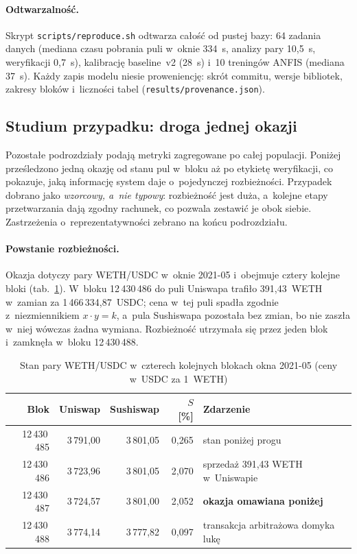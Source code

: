 \paragraph{Odtwarzalność.} Skrypt \texttt{scripts/reproduce.sh} odtwarza całość od pustej bazy:
64 zadania danych (mediana czasu pobrania puli w~oknie 334~s, analizy pary 10,5~s, weryfikacji
0,7~s), kalibrację baseline~v2 (28~s) i~10 treningów ANFIS (mediana 37~s). Każdy zapis modelu
niesie proweniencję: skrót commitu, wersje bibliotek, zakresy bloków i~liczności tabel
(\texttt{results/provenance.json}).

\subsection{Studium przypadku: droga jednej okazji}

Pozostałe podrozdziały podają metryki zagregowane po całej populacji. Poniżej prześledzono jedną okazję od stanu pul w~bloku
aż po etykietę weryfikacji, co pokazuje, jaką informację system daje o~pojedynczej
rozbieżności. Przypadek dobrano jako \emph{wzorcowy, a~nie typowy}:
rozbieżność jest duża, a~kolejne etapy przetwarzania dają zgodny rachunek, co pozwala zestawić
je obok siebie. Zastrzeżenia o~reprezentatywności zebrano na końcu podrozdziału.


\paragraph{Powstanie rozbieżności.} Okazja dotyczy pary WETH/USDC w~oknie 2021-05 i~obejmuje
cztery kolejne bloki (tab.~\ref{tab:case-blocks}). W~bloku 12\,430\,486 do puli Uniswapa trafiło
391,43~WETH w~zamian za 1\,466\,334,87~USDC; cena w~tej puli spadła zgodnie z~niezmiennikiem
$x\cdot y=k$, a~pula Sushiswapa pozostała bez zmian, bo nie zaszła w~niej wówczas żadna wymiana.
Rozbieżność utrzymała się przez jeden blok i~zamknęła w~bloku 12\,430\,488.

\begin{table}[H]\centering\small
\caption{Stan pary WETH/USDC w~czterech kolejnych blokach okna 2021-05 (ceny w~USDC za 1~WETH)}
\label{tab:case-blocks}
\begin{tabular}{rrrrl}
\toprule
Blok & Uniswap & Sushiswap & $S$ [\%] & Zdarzenie \\
\midrule
12\,430\,485 & 3\,791,00 & 3\,801,05 & 0,265 & stan poniżej progu \\
12\,430\,486 & 3\,723,96 & 3\,801,05 & 2,070 & sprzedaż 391,43 WETH w~Uniswapie \\
12\,430\,487 & 3\,724,57 & 3\,801,00 & 2,052 & \textbf{okazja omawiana poniżej} \\
12\,430\,488 & 3\,774,14 & 3\,777,82 & 0,097 & transakcja arbitrażowa domyka lukę \\
\bottomrule
\end{tabular}
\end{table}

